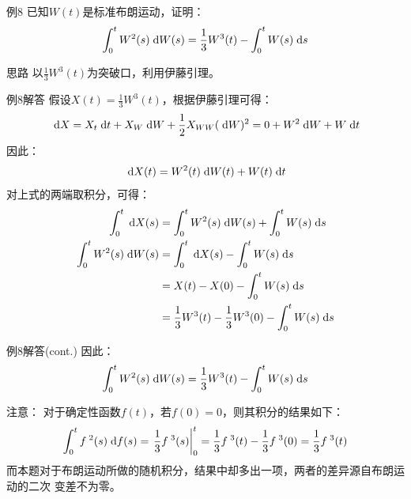 \documentclass[t]{beamer}
\newcommand{\dif}{{\;\rm d}}
\begin{document}
\begin{frame}{例8}
    已知$W(t)$是标准布朗运动，证明：
\[\int^t_0 W^2(s)\dif W(s)=\frac{1}{3}W^3(t)-\int^t_0 W(s)\dif s \]

\begin{block}{思路}
    以$\frac{1}{3}W^3(t)$为突破口，利用伊藤引理。
\end{block}
\end{frame}


\begin{frame}{例8解答}\small
        假设$X(t)=\displaystyle\frac{1}{3}W^3(t)$，根据伊藤引理可得：
        \[\dif X=X_t \dif t+X_W\dif W+\frac{1}{2}X_{WW}(\dif W)^2=0+W^2\dif W+W\dif t \]
        因此：
        \[\dif X(t)=W^2(t)\dif W(t)+W(t)\dif t \]
        对上式的两端取积分，可得：
        \[\begin{split}
        \int^t_0\dif X(s)&=\int^t_0W^2(s)\dif W(s)+\int^t_0 W(s)\dif s\\
        \int^t_0W^2(s)\dif W(s)&=\int^t_0\dif X(s)-\int^t_0 W(s)\dif s\\
        &=X(t)-X(0)-\int^t_0 W(s)\dif s\\
        &=\frac{1}{3}W^3(t)-\frac{1}{3}W^3(0)-\int^t_0 W(s)\dif s\\
        \end{split} \]
    \end{frame}


    \begin{frame}{例8解答(cont.)}
        因此：
        \[\int^t_0W^2(s)\dif W(s)=\frac{1}{3}W^3(t)-\int^t_0 W(s)\dif s \]

        \begin{block}{注意：}
            对于确定性函数$f(t)$，若$f(0)=0$，则其积分的结果如下：
            \[\int^t_0 f^{\;2}(s)\dif f(s)=\left.\frac{1}{3}f^{\;3}(s)\right|^t_0=\frac{1}{3}f^{\;3}(t)-\frac{1}{3}f^{\;3}(0)=\frac{1}{3}f^{\;3}(t) \]
            而本题对于布朗运动所做的随机积分，结果中却多出一项，两者的差异源自布朗运动的二次
变差不为零。
        \end{block}
       
\end{frame}
\end{document}
